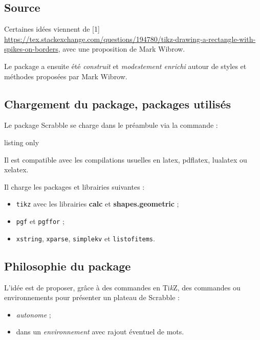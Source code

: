 \documentclass{article}
\providecommand\tikzlogo{Ti\textit{k}Z}
\let\TikZ\tikzlogo
\newcommand\Cle[1]{{\bfseries\sffamily\textlangle #1\textrangle}}
\begin{document}
\subsection{Source}

Certaines idées viennent de \scalebox{0.75}[1]{\ttfamily\url{ https://tex.stackexchange.com/questions/194780/tikz-drawing-a-rectangle-with-spikes-on-borders}}, avec une proposition de Mark Wibrow.

\smallskip

Le package a ensuite été \textit{construit} et \textit{modestement enrichi} autour de styles et méthodes proposées par Mark Wibrow.

\subsection{Chargement du package, packages utilisés}

Le package \textsf{Scrabble} se charge dans le préambule via la commande :

\begin{PresentationCode}{listing only}
\usepackage{Scrabble}
\end{PresentationCode}

Il est compatible avec les compilations usuelles en \textsf{latex}, \textsf{pdflatex}, \textsf{lualatex} ou \textsf{xelatex}.

\medskip

Il charge les packages et librairies suivantes :

\begin{itemize}
	\item \texttt{tikz} avec les librairies \Cle{calc} et \Cle{shapes.geometric} ;
	\item \texttt{pgf} et \texttt{pgffor} ;
	\item \texttt{xstring}, \texttt{xparse}, \texttt{simplekv} et \texttt{listofitems}.
\end{itemize}

\subsection{\og Philosophie \fg{} du package}

L'idée est de proposer, grâce à des commandes en \TikZ, des \textsf{commandes} ou \textsf{environnements} pour présenter un plateau de Scrabble\texttrademark{} :

\begin{itemize}
	\item \textit{autonome} ;
	\item dans un \textit{environnement} avec rajout éventuel de mots.
\end{itemize}
\end{document}
